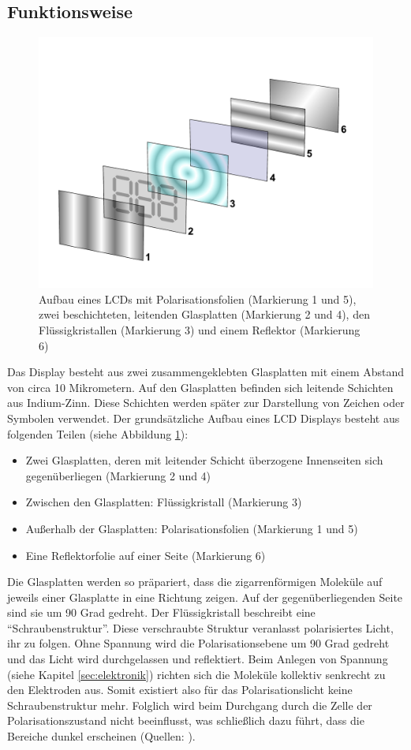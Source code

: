 \label{testmuster-seite1}
\subsection{Funktionsweise}

\begin{figure}[t]
  \centering
  \includegraphics[height=0.3\textwidth, keepaspectratio]{Bilder/LCD_layers}
  \caption{Aufbau eines LCDs mit Polarisationsfolien (Markierung 1 und 5), zwei beschichteten, leitenden Glasplatten (Markierung 2 und 4), den Flüssigkristallen (Markierung 3) und einem Reflektor (Markierung 6)
  \cite{lcdlayers}}
  \label{lcdaufbau}
\end{figure}

Das Display besteht aus zwei zusammengeklebten Glasplatten mit einem Abstand von circa 10 Mikrometern. Auf den Glasplatten befinden sich leitende Schichten aus Indium-Zinn. Diese Schichten werden später zur Darstellung von Zeichen oder Symbolen verwendet. Der grundsätzliche Aufbau eines LCD Displays besteht aus folgenden Teilen (siehe Abbildung \ref{lcdaufbau}):
\begin{itemize}
\item Zwei Glasplatten, deren mit leitender Schicht überzogene Innenseiten sich gegenüberliegen (Markierung 2 und 4)
\item Zwischen den Glasplatten: Flüssigkristall (Markierung 3)
\item Außerhalb der Glasplatten: Polarisationsfolien (Markierung 1 und 5)
\item Eine Reflektorfolie auf einer Seite (Markierung 6)
\end{itemize}
Die Glasplatten werden so präpariert, dass die zigarrenförmigen Moleküle auf jeweils einer Glasplatte in eine Richtung zeigen. Auf der gegenüberliegenden Seite sind sie um 90 Grad gedreht. Der Flüssigkristall beschreibt eine “Schraubenstruktur”.
Diese verschraubte Struktur veranlasst polarisiertes Licht, ihr zu folgen. Ohne Spannung wird die Polarisationsebene um 90 Grad gedreht und das Licht wird durchgelassen und reflektiert. Beim Anlegen von Spannung (siehe Kapitel \ref{sec:elektronik}) richten sich die Moleküle kollektiv senkrecht zu den Elektroden aus.
Somit existiert also für das Polarisationslicht keine Schraubenstruktur mehr.
Folglich wird beim Durchgang durch die Zelle der Polarisationszustand nicht beeinflusst, was schließlich dazu führt, dass die Bereiche dunkel erscheinen (Quellen: \cite{Bauanleitung} \cite{aufbau_und_funktion}).


